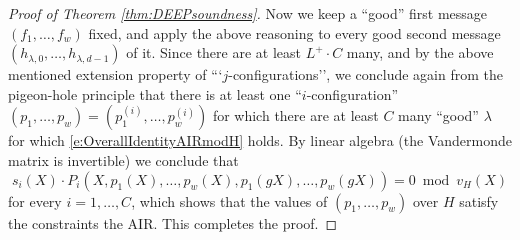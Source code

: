 \documentclass[11pt,article,oneside]{memoir}
\theoremstyle{definition}
\theoremstyle{remark}
\begin{document}
\begin{proof}[Proof of Theorem \ref{thm:DEEPsoundness}]
Now we keep a ``good'' first message $(f_1,\ldots, f_w)$ fixed, and apply the above reasoning to every good second message $(h_{\lambda,0},\ldots, h_{\lambda, d-1})$ of it. 
Since there are at least $L^+\cdot C$ many, and by the above mentioned extension property of ```$j$-configurations'', we conclude again from the pigeon-hole principle that there is at least one ``$i$-configuration'' $(p_1,\ldots, p_w) = (p_1^{(i)}, \ldots,p_w^{(i)})$ for which there are at least $C$ many “good” $\lambda$ for which \eqref{e:OverallIdentityAIRmodH} holds.
By linear algebra (the Vandermonde matrix is invertible) we conclude that  
\[
s_i(X)\cdot P_i(X, p_1(X), \ldots, p_w(X), p_1(gX), \ldots, p_w(g X)) = 0 \bmod v_H(X)
\]
for every $i =1, \ldots, C$, which shows that the values of $(p_1,\ldots, p_w)$ over $H$ satisfy the constraints the AIR.
This completes the proof.
%
%

\end{proof}
\end{document}
